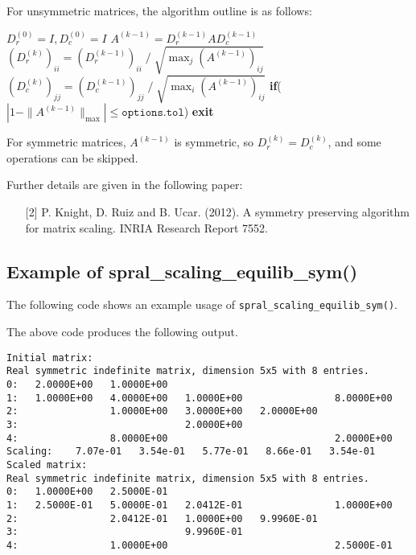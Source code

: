 \noindent
For unsymmetric matrices, the algorithm outline is as follows:
\begin{algorithmic}
   \setlength{\itemsep}{2pt}
   \STATE $D_r^{(0)} = I, D_c^{(0)}=I$
      \setlength{\itemsep}{2pt}
      \STATE $A^{(k-1)} = D_r^{(k-1)} A D_c^{(k-1)}$
      \STATE $(D_r^{(k)})_{ii} = (D_r^{(k-1)})_{ii}\; /\; \sqrt{\max_j(A^{(k-1)})_{ij}}$
      \STATE $(D_c^{(k)})_{jj} = (D_c^{(k-1)})_{jj}\; /\; \sqrt{\max_i(A^{(k-1)})_{ij}}$
      \STATE\textbf{if}($|1-\|A^{(k-1)}\|_{\max}|\le\texttt{options.tol}$) \textbf{exit}
   \ENDFOR
\end{algorithmic}
For symmetric matrices, $A^{(k-1)}$ is symmetric, so $D_r^{(k)} = D_c^{(k)}$, and
some operations can be skipped.

\vspace*{0.3cm}
\noindent
Further details are given in the following paper:
\vspace{-0.1cm}
\begin{itemize}
   \item[{[2]}] P. Knight, D. Ruiz and B. Ucar. (2012). A symmetry preserving algorithm for matrix scaling. INRIA Research Report 7552.
\end{itemize}

\subsection{Example of spral\_scaling\_equilib\_sym()}
The following code shows an example usage of \texttt{spral\_scaling\_equilib\_sym()}.

The above code produces the following output.
\begin{verbatim}
Initial matrix:
Real symmetric indefinite matrix, dimension 5x5 with 8 entries.
0:   2.0000E+00   1.0000E+00                                       
1:   1.0000E+00   4.0000E+00   1.0000E+00                8.0000E+00
2:                1.0000E+00   3.0000E+00   2.0000E+00             
3:                             2.0000E+00                          
4:                8.0000E+00                             2.0000E+00
Scaling:    7.07e-01   3.54e-01   5.77e-01   8.66e-01   3.54e-01
Scaled matrix:
Real symmetric indefinite matrix, dimension 5x5 with 8 entries.
0:   1.0000E+00   2.5000E-01                                       
1:   2.5000E-01   5.0000E-01   2.0412E-01                1.0000E+00
2:                2.0412E-01   1.0000E+00   9.9960E-01             
3:                             9.9960E-01                          
4:                1.0000E+00                             2.5000E-01
\end{verbatim}

